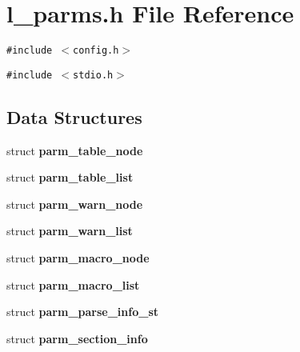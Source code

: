 \section{l\_\-parms.h File Reference}
\label{l__parms_8h}
{\tt \#include $<$config.h$>$}\par
{\tt \#include $<$stdio.h$>$}\par
\subsection*{Data Structures}
\begin{CompactItemize}
\item 
struct \bf{parm\_\-table\_\-node}
\item 
struct \bf{parm\_\-table\_\-list}
\item 
struct \bf{parm\_\-warn\_\-node}
\item 
struct \bf{parm\_\-warn\_\-list}
\item 
struct \bf{parm\_\-macro\_\-node}
\item 
struct \bf{parm\_\-macro\_\-list}
\item 
struct \bf{parm\_\-parse\_\-info\_\-st}
\item 
struct \bf{parm\_\-section\_\-info}
\end{CompactItemize}
